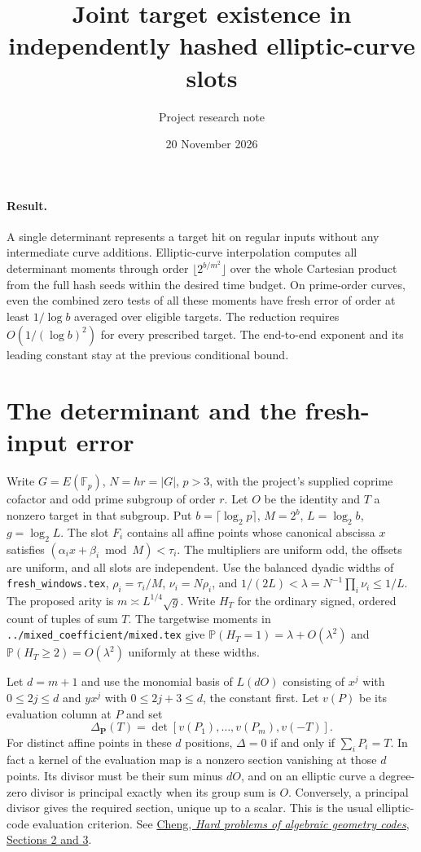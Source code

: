 \documentclass[11pt]{article}
\title{Joint target existence in independently hashed elliptic-curve slots}
\author{Project research note}
\date{20 November 2026}
\newcommand{\F}{\mathbb F}
\newcommand{\Prob}{\mathbb P}
\begin{document}
\maketitle

\paragraph{Result.}
A single determinant represents a target hit on regular inputs without any intermediate curve additions.
Elliptic-curve interpolation computes all determinant moments through order
$\lfloor 2^{b/m^2}\rfloor$ over the whole Cartesian product from the full
hash seeds within the desired time budget. On prime-order curves, even
the combined zero tests of all these moments have fresh error of order
at least $1/\log b$ averaged over eligible targets. The reduction requires
$O(1/(\log b)^2)$ for every
prescribed target. The end-to-end exponent and its leading constant stay at
the previous conditional bound.

\section{The determinant and the fresh-input error}

Write $G=E(\F_p)$, $N=hr=|G|$, $p>3$, with the project's supplied coprime
cofactor and odd prime subgroup of order $r$. Let $O$ be the identity and
$T$ a nonzero target in that subgroup. Put $b=\lceil\log_2 p\rceil$,
$M=2^b$, $L=\log_2 b$, $g=\log_2 L$. The slot $F_i$ contains all affine
points whose canonical abscissa $x$ satisfies
$(\alpha_i x+\beta_i\bmod M)<\tau_i$. The multipliers are uniform odd,
the offsets are uniform, and all slots are independent.
Use the balanced dyadic widths of \texttt{fresh\_windows.tex},
$\rho_i=\tau_i/M$, $\nu_i=N\rho_i$, and
$1/(2L)<\lambda=N^{-1}\prod_i\nu_i\le1/L$.
The proposed arity is $m\asymp L^{1/4}\sqrt g$.
Write $H_T$ for the ordinary signed, ordered count of tuples of sum $T$.
The targetwise moments in \texttt{../mixed\_coefficient/mixed.tex} give
$\Prob(H_T=1)=\lambda+O(\lambda^2)$ and
$\Prob(H_T\ge2)=O(\lambda^2)$ uniformly at these widths.

Let $d=m+1$ and use the monomial basis of $L(dO)$ consisting of $x^j$
with $0\le 2j\le d$ and $yx^j$ with $0\le 2j+3\le d$, the constant
first. Let $v(P)$ be its evaluation column at $P$ and set
\[
 \Delta_{\mathbf P}(T)=\det[v(P_1),\ldots,v(P_m),v(-T)] .
\]
For distinct affine points in these $d$ positions, $\Delta=0$ if and only if
$\sum_iP_i=T$. In fact a kernel of the evaluation map is a nonzero section
vanishing at those $d$ points. Its divisor must be their sum minus $dO$,
and on an elliptic curve a degree-zero divisor is principal exactly when
its group sum is $O$. Conversely, a principal divisor gives the required
section, unique up to a scalar. This is the usual elliptic-code evaluation
criterion. See \href{https://arxiv.org/html/cs/0507026}{Cheng,
\emph{Hard problems of algebraic geometry codes}, Sections 2 and 3}.
\end{document}
